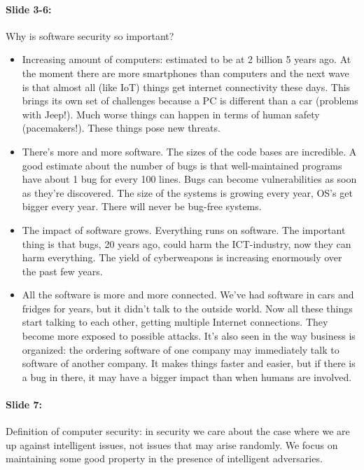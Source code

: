 \documentclass[10pt,a4paper]{report}
\begin{document}
\paragraph{Slide 3-6:} Why is software security so important?
\begin{itemize}
\item Increasing amount of computers: estimated to be at 2 billion 5 years ago. At the moment there are more smartphones than computers and the next wave is that almost all (like IoT) things get internet connectivity these days. This brings its own set of challenges because a PC is different than a car (problems with Jeep!). Much worse things can happen in terms of human safety (pacemakers!). These things pose new threats.
\item There's more and more software. The sizes of the code bases are incredible. A good estimate about the number of bugs is that well-maintained programs have about 1 bug for every 100 lines. Bugs can become vulnerabilities as soon as they're discovered. The size of the systems is growing every year, OS's get bigger every year. There will never be bug-free systems. 
\item The impact of software grows. Everything runs on software. The important thing is that bugs, 20 years ago, could harm the ICT-industry, now they can harm everything. The yield of cyberweapons is increasing enormously over the past few years. 
\item All the software is more and more connected. We've had software in cars and fridges for years, but it didn't talk to the outside world. Now all these things start talking to each other, getting multiple Internet connections. They become more exposed to possible attacks. It's also seen in the way business is organized: the ordering software of one company may immediately talk to software of another company. It makes things faster and easier, but if there is a bug in there, it may have a bigger impact than when humans are involved.
\end{itemize}

\paragraph{Slide 7:} Definition of computer security: in security we care about the case where we are up against intelligent issues, not issues that may arise randomly. We focus on maintaining some good property in the presence of intelligent adversaries.
\end{document}
